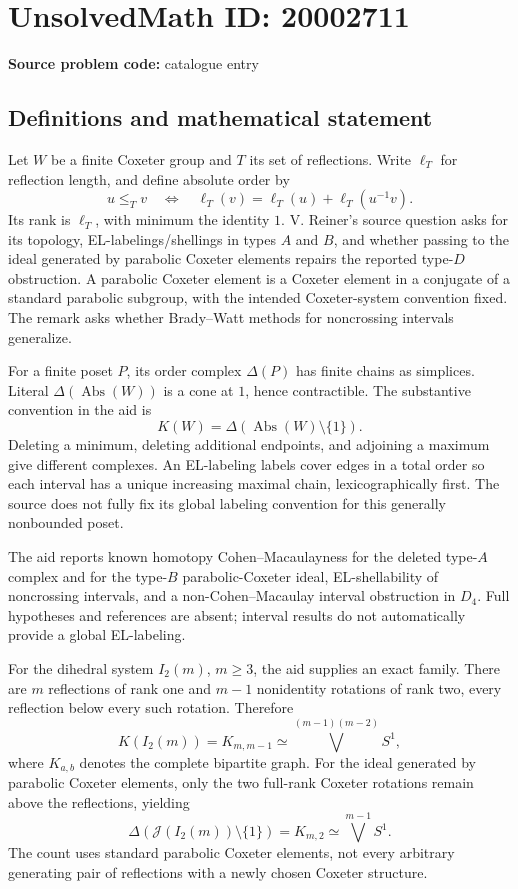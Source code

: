 \documentclass[11pt]{article}
\begin{document}
\section*{UnsolvedMath ID: 20002711}
\textbf{Source problem code:} catalogue entry
\subsection{Definitions and mathematical statement}
Let $W$ be a finite Coxeter group and $T$ its set of reflections. Write $\ell_T$ for reflection length, and define absolute order by
\[
 u\le_Tv\quad\Longleftrightarrow\quad
 \ell_T(v)=\ell_T(u)+\ell_T(u^{-1}v).
\]
Its rank is $\ell_T$, with minimum the identity $1$. V. Reiner's source question asks for its topology, EL-labelings/shellings in types $A$ and $B$, and whether passing to the ideal generated by parabolic Coxeter elements repairs the reported type-$D$ obstruction. A parabolic Coxeter element is a Coxeter element in a conjugate of a standard parabolic subgroup, with the intended Coxeter-system convention fixed. The remark asks whether Brady--Watt methods for noncrossing intervals generalize.

For a finite poset $P$, its order complex $\Delta(P)$ has finite chains as simplices. Literal $\Delta(\operatorname{Abs}(W))$ is a cone at $1$, hence contractible. The substantive convention in the aid is
\[
 K(W)=\Delta(\operatorname{Abs}(W)\setminus\{1\}).
\]
Deleting a minimum, deleting additional endpoints, and adjoining a maximum give different complexes. An EL-labeling labels cover edges in a total order so each interval has a unique increasing maximal chain, lexicographically first. The source does not fully fix its global labeling convention for this generally nonbounded poset.

The aid reports known homotopy Cohen--Macaulayness for the deleted type-$A$ complex and for the type-$B$ parabolic-Coxeter ideal, EL-shellability of noncrossing intervals, and a non-Cohen--Macaulay interval obstruction in $D_4$. Full hypotheses and references are absent; interval results do not automatically provide a global EL-labeling.

For the dihedral system $I_2(m)$, $m\ge3$, the aid supplies an exact family. There are $m$ reflections of rank one and $m-1$ nonidentity rotations of rank two, every reflection below every such rotation. Therefore
\[
 K(I_2(m))=K_{m,m-1}\simeq
 \bigvee^{(m-1)(m-2)}S^1,
\]
where $K_{a,b}$ denotes the complete bipartite graph. For the ideal generated by parabolic Coxeter elements, only the two full-rank Coxeter rotations remain above the reflections, yielding
\[
 \Delta(\mathcal J(I_2(m))\setminus\{1\})=K_{m,2}
 \simeq\bigvee^{m-1}S^1.
\]
The count uses standard parabolic Coxeter elements, not every arbitrary generating pair of reflections with a newly chosen Coxeter structure.
\end{document}
